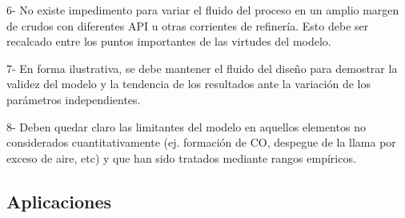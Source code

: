 6-      No existe impedimento para variar el fluido del proceso en un amplio margen de crudos con diferentes API u otras corrientes de refinería. Esto debe ser recalcado entre los puntos importantes de las virtudes del modelo.

7-      En forma ilustrativa, se debe mantener el fluido del diseño para demostrar la validez del modelo y  la tendencia de los resultados ante la variación de los parámetros independientes.

8-      Deben quedar claro las limitantes del modelo en aquellos elementos no considerados cuantitativamente (ej. formación de CO, despegue de la llama por exceso de aire, etc) y que han sido tratados mediante rangos empíricos.

\subsection{Aplicaciones}
